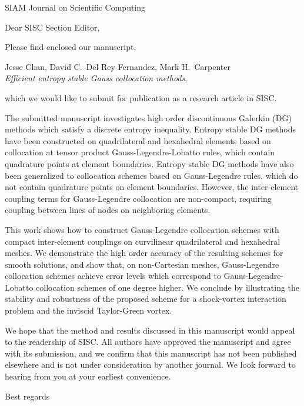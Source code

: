 \documentclass{letter}
\begin{document}
\begin{letter}{SIAM Journal on Scientific Computing}


\opening{Dear SISC Section Editor,}

Please find enclosed our manuscript, 
\begin{center}
Jesse Chan, David C.\ Del Rey Fernandez, Mark H.\ Carpenter\\
\textit{Efficient entropy stable Gauss collocation methods},
\end{center}
which we would like to submit for publication as a research article in SISC.  

The submitted manuscript investigates high order discontinuous Galerkin (DG) methods which satisfy a discrete entropy inequality.  Entropy stable DG methods have been constructed on quadrilateral and hexahedral elements based on collocation at tensor product Gauss-Legendre-Lobatto rules, which contain quadrature points at element boundaries.  Entropy stable DG methods have also been generalized to collocation schemes based on Gauss-Legendre rules, which do not contain quadrature points on element boundaries.  However, the inter-element coupling terms for Gauss-Legendre collocation are non-compact, requiring coupling between lines of nodes on neighboring elements.  

This work shows how to construct Gauss-Legendre collocation schemes with compact inter-element couplings on curvilinear quadrilateral and hexahedral meshes.  We demonstrate the high order accuracy of the resulting schemes for smooth solutions, and show that, on non-Cartesian meshes, Gauss-Legendre collocation schemes achieve error levels which correspond to Gauss-Legendre-Lobatto collocation schemes of one degree higher.  We conclude by illustrating the stability and robustness of the proposed scheme for a shock-vortex interaction problem and the inviscid Taylor-Green vortex.

We hope that the method and results discussed in this manuscript would appeal to the readership of SISC.  All authors have approved the manuscript and agree with its submission, and we confirm that this manuscript has not been published elsewhere and is not under consideration by another journal.  We look forward to hearing from you at your earliest convenience.

\closing{Best regards}

\end{letter}
\end{document}
